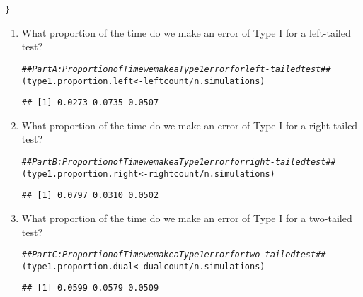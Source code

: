 \documentclass{article}\usepackage[]{graphicx}\usepackage[]{xcolor}
\makeatletter
\newcommand{\hlcom}[1]{\textcolor[rgb]{0.678,0.584,0.686}{\textit{#1}}}%
\newcommand{\hlopt}[1]{\textcolor[rgb]{0,0,0}{#1}}%
\newcommand{\hldef}[1]{\textcolor[rgb]{0.345,0.345,0.345}{#1}}%
\newcommand{\hlkwb}[1]{\textcolor[rgb]{0.69,0.353,0.396}{#1}}%
\newenvironment{kframe}{%
 \def\at@end@of@kframe{}%
 \ifinner\ifhmode%
  \def\at@end@of@kframe{\end{minipage}}%
  \begin{minipage}{\columnwidth}%
 \fi\fi%
 \def\FrameCommand##1{\hskip\@totalleftmargin \hskip-\fboxsep
 \colorbox{shadecolor}{##1}\hskip-\fboxsep
     \hskip-\linewidth \hskip-\@totalleftmargin \hskip\columnwidth}%
 \MakeFramed {\advance\hsize-\width
   \@totalleftmargin\z@ \linewidth\hsize
   \@setminipage}}%
 {\par\unskip\endMakeFramed%
 \at@end@of@kframe}
\newenvironment{knitrout}{}{} %
\makeatother
\begin{document}
\begin{enumerate}
\begin{knitrout}
\begin{kframe}
\begin{alltt}
\hldef{\}}
\end{alltt}
\end{kframe}
\end{knitrout}
  \begin{enumerate}
    \item What proportion of the time do we make an error of Type I for a
    left-tailed test?

\begin{knitrout}
\color{fgcolor}\begin{kframe}
\begin{alltt}
\hlcom{## Part A: Proportion of Time we make a Type 1 error for left-tailed test ##}
\hldef{(type1.proportion.left} \hlkwb{<-} \hldef{leftcount}\hlopt{/}\hldef{n.simulations)}
\end{alltt}
\begin{verbatim}
## [1] 0.0273 0.0735 0.0507
\end{verbatim}
\end{kframe}
\end{knitrout}

    \item What proportion of the time do we make an error of Type I for a
    right-tailed test?
\begin{knitrout}
\color{fgcolor}\begin{kframe}
\begin{alltt}
\hlcom{## Part B: Proportion of Time we make a Type 1 error for right-tailed test ##}
\hldef{(type1.proportion.right} \hlkwb{<-} \hldef{rightcount}\hlopt{/}\hldef{n.simulations)}
\end{alltt}
\begin{verbatim}
## [1] 0.0797 0.0310 0.0502
\end{verbatim}
\end{kframe}
\end{knitrout}
    \item What proportion of the time do we make an error of Type I for a
    two-tailed test?
\begin{knitrout}
\color{fgcolor}\begin{kframe}
\begin{alltt}
\hlcom{## Part C: Proportion of Time we make a Type 1 error for two-tailed test ##}
\hldef{(type1.proportion.dual} \hlkwb{<-} \hldef{dualcount}\hlopt{/}\hldef{n.simulations)}
\end{alltt}
\begin{verbatim}
## [1] 0.0599 0.0579 0.0509
\end{verbatim}
\end{kframe}
\end{knitrout}


\end{enumerate}
\end{enumerate}
\end{document}
